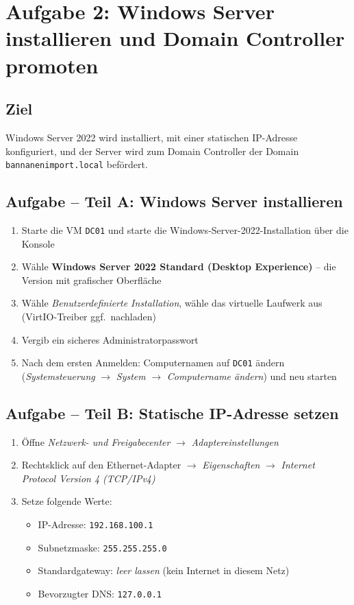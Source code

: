 \documentclass[11pt, oneside, numbers=noenddot]{scrbook}
\begin{document}
\newpage

\section{Aufgabe 2: Windows Server installieren und Domain Controller promoten}

\subsection*{Ziel}
Windows Server 2022 wird installiert, mit einer statischen IP-Adresse konfiguriert, und der Server wird zum Domain Controller der Domain \texttt{bannanenimport.local} befördert.

\subsection*{Aufgabe -- Teil A: Windows Server installieren}
\begin{enumerate}
  \item Starte die VM \texttt{DC01} und starte die Windows-Server-2022-Installation über die Konsole
  \item Wähle \textbf{Windows Server 2022 Standard (Desktop Experience)} -- die Version mit grafischer Oberfläche
  \item Wähle \textit{Benutzerdefinierte Installation}, wähle das virtuelle Laufwerk aus (VirtIO-Treiber ggf.\ nachladen)
  \item Vergib ein sicheres Administratorpasswort
  \item Nach dem ersten Anmelden: Computernamen auf \texttt{DC01} ändern\\
        (\textit{Systemsteuerung} $\rightarrow$ \textit{System} $\rightarrow$ \textit{Computername ändern}) und neu starten
\end{enumerate}

\subsection*{Aufgabe -- Teil B: Statische IP-Adresse setzen}
\begin{enumerate}
  \item Öffne \textit{Netzwerk- und Freigabecenter} $\rightarrow$ \textit{Adaptereinstellungen}
  \item Rechtsklick auf den Ethernet-Adapter $\rightarrow$ \textit{Eigenschaften} $\rightarrow$ \textit{Internet Protocol Version 4 (TCP/IPv4)}
  \item Setze folgende Werte:
  \begin{itemize}
    \item IP-Adresse: \texttt{192.168.100.1}
    \item Subnetzmaske: \texttt{255.255.255.0}
    \item Standardgateway: \textit{leer lassen} (kein Internet in diesem Netz)
    \item Bevorzugter DNS: \texttt{127.0.0.1} 
  \end{itemize}
\end{enumerate}
\end{document}
